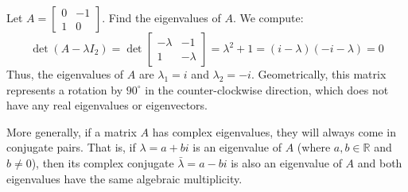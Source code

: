 \begin{eg}
    Let $A = \begin{bmatrix}
        0 & -1 \\ 1 & 0
    \end{bmatrix}$. Find the eigenvalues of $A$. We compute:
    \[\det(A - \lambda I_2) = \det\begin{bmatrix}
        -\lambda & -1 \\ 1 & -\lambda
    \end{bmatrix} = \lambda^2 + 1 = (i - \lambda)(-i - \lambda) = 0\]
    Thus, the eigenvalues of $A$ are $\lambda_1 = i$ and $\lambda_2 = -i$. Geometrically, this matrix represents a rotation by $90^\circ$ in the counter-clockwise direction, which does not have any real eigenvalues or eigenvectors.
\end{eg}
More generally, if a matrix $A$ has complex eigenvalues, they will always come in conjugate pairs. That is, if $\lambda = a + bi$ is an eigenvalue of $A$ (where $a,b \in \mathbb{R}$ and $b \neq 0$), then its complex conjugate $\bar{\lambda} = a - bi$ is also an eigenvalue of $A$ and both eigenvalues have the same algebraic multiplicity.

